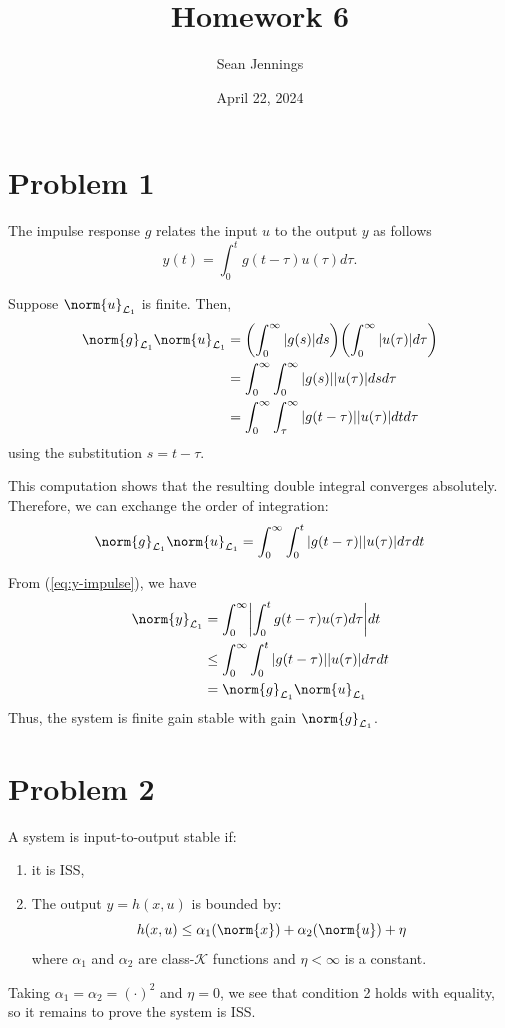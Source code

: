 \documentclass{homework}
\title{Homework 6}
\author{Sean Jennings}
\date{April 22, 2024}
\newcommand{\K}{\mathcal{K}}
\renewcommand{\L}{\mathcal{L}}
\begin{document}
\maketitle

\section{Problem 1}
The impulse response $g$ relates the input $u$ to the output $y$
as follows
\begin{equation}
    y(t) = \int_{0}^{t} g(t - \tau) u(\tau) d\tau.
    \label{eq:y-impulse}
\end{equation}

Suppose $\norm{u}_{\L_1}$ is finite. Then,
\begin{align*}
    \norm{g}_{\L_1} \norm{u}_{\L_1} &= 
        \biggl(\int_{0}^{\infty} |g(s)| ds \biggr)
        \biggl(\int_{0}^{\infty} |u(\tau)| d\tau \biggr) \\
        &= \int_{0}^{\infty} \int_{0}^{\infty}
            |g(s)||u(\tau)| ds d\tau \\
        &= \int_{0}^{\infty} \int_{\tau}^{\infty}
            |g(t - \tau)||u(\tau)| dt d\tau
\end{align*}
using the substitution $s = t - \tau$.

This computation shows that the resulting double integral
converges absolutely. Therefore, we can exchange the order of 
integration:
\begin{equation*}
    \norm{g}_{\L_1} \norm{u}_{\L_1} = 
        \int_{0}^{\infty} \int_{0}^{t}
            |g(t - \tau)||u(\tau)| d\tau dt
\end{equation*}

From (\ref{eq:y-impulse}), we have
\begin{align*}
    \norm{y}_{\L_1} &= \int_{0}^{\infty}
        \biggl|\int_{0}^{t} g(t - \tau) u(\tau) d\tau \biggr|
        dt \\
        &\leq \int_{0}^{\infty}
            \int_{0}^{t} |g(t - \tau)| |u(\tau)| d\tau dt \\
        &= \norm{g}_{\L_1} \norm{u}_{\L_1}
\end{align*}
Thus, the system is finite gain stable with gain $\norm{g}_{\L_1}$.



\section{Problem 2}
A system is input-to-output stable if:
\begin{enumerate}
    \item it is ISS,
    \item The output $y = h(x, u)$ is bounded by:
        \begin{equation*}
            h(x, u) \leq \alpha_1 (\norm{x}) + \alpha_2 (\norm{u}) + \eta
        \end{equation*}
        where $\alpha_1$ and $\alpha_2$ are class-$\K$ functions
        and $\eta < \infty$ is a constant.
\end{enumerate}
Taking $\alpha_1 = \alpha_2 = (\cdot)^2$ and $\eta=0$, we see that
condition 2 holds with equality, so it remains to prove the system is
ISS.
\end{document}
